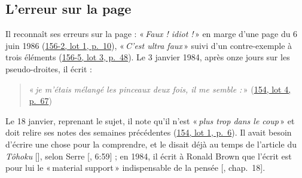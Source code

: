 \documentclass[11pt]{amsart}
\makeatletter
\newcommand{\ts}[1]{\foreignlanguage{english}{#1}}
\newcommand{\q}[1]{«\,\textit{#1}\,»}
\newcommand{\mot}[1]{«\,#1\,»}
\def\RHM@first#1--#2\@nil{#1}
\DeclareRobustCommand{\lot}[3]{\begingroup\edef\RHM@pdfpage{\the\numexpr\RHM@first#3--\@nil+1\relax}\href{https://grothendieck.umontpellier.fr/#1.pdf\#page=\RHM@pdfpage}{#1, lot #2, p.~#3}\endgroup}
\newcommand{\lot}[3]{\href{https://grothendieck.commutator.io/\##1/#2/p#3}{#1, lot #2, p.~#3}}
\makeatother
\begin{document}
\subsection{L'erreur sur la page}\label{sub:erreur}

Il reconnaît ses erreurs sur la page : \q{Faux ! idiot !} en marge d'une page du 6 juin 1986 (\lot{156-2}{1}{10}), \q{C'est ultra faux} suivi d'un contre-exemple à trois éléments (\lot{156-5}{3}{48}). Le 3 janvier 1984, après onze jours sur les pseudo-droites, il écrit :

\begin{quote}
«\,\textit{je m'étais mélangé les pinceaux \emph{deux} fois, il me semble :}\,» (\lot{154}{4}{67})
\end{quote}

\noindent Le 18 janvier, reprenant le sujet, il note qu'il n'est \q{plus trop dans le coup} et doit relire ses notes des semaines précédentes (\lot{154}{1}{6}). Il avait besoin d'écrire une chose pour la comprendre, et le disait déjà au temps de l'article du \emph{Tôhoku} [\citealp{grothendieck1957}], selon Serre [\citealp{serreconnes2019}, \ts{6:59}] ; en 1984, il écrit à Ronald Brown que l'écrit est pour lui le \mot{\foreignlanguage{english}{material support}} indispensable de la pensée [\citealp{circle-spirit}, chap.~18].
\end{document}
